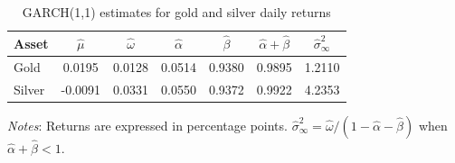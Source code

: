 \begin{table}[H]
\centering
\caption{GARCH(1,1) estimates for gold and silver daily returns}
\label{tab:garch-params}
\begin{tabular}{lcccccc}
\toprule
Asset & $\hat{\mu}$ & $\hat{\omega}$ & $\hat{\alpha}$ & $\hat{\beta}$ & $\hat{\alpha}+\hat{\beta}$ & $\hat{\sigma}^2_{\infty}$ \\
\midrule
Gold & 0.0195 & 0.0128 & 0.0514 & 0.9380 & 0.9895 & 1.2110 \\
Silver & -0.0091 & 0.0331 & 0.0550 & 0.9372 & 0.9922 & 4.2353 \\
\bottomrule
\end{tabular}
\vspace{0.2cm}
\begin{minipage}{0.9\textwidth}
\footnotesize
\textit{Notes}: Returns are expressed in percentage points. $\hat{\sigma}^2_{\infty} = \hat{\omega}/(1-\hat{\alpha}-\hat{\beta})$ when $\hat{\alpha}+\hat{\beta}<1$.
\end{minipage}
\end{table}
